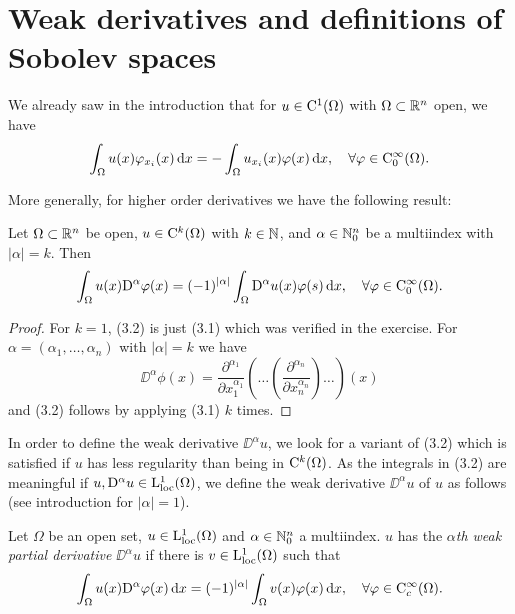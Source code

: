 \section{Weak derivatives and definitions of Sobolev spaces}

We already saw in the introduction that for $u \in \mathrm{C}^1(\Omega)$ with $\Omega \subset \mathbb{R}^n$ open, we have 
\begin{equation}
  \int_\Omega u(x) \varphi_{x_i}(x) \, {\operatorname{d}\!{x}} = -\int_\Omega u_{x_i}(x) \varphi(x) \, {\operatorname{d}\!{x}}, \quad \forall \varphi \in \mathrm{C}_0^\infty(\Omega).
\end{equation}

More generally, for higher order derivatives we have the following result:
\begin{lem}
  Let $\Omega \subset \mathbb{R}^n$ be open, $u \in \mathrm{C}^k(\Omega)$ with $k \in \mathbb{N}$, and $\alpha \in \mathbb{N}_0^n$ be a multiindex with $|\alpha| = k$. Then
  \begin{equation}
    \int_\Omega u(x) \mathrm{D}^\alpha \varphi(x) = (-1)^{|\alpha|} \int_\Omega \mathrm{D}^\alpha u(x) \varphi(s) \, {\operatorname{d}\!{x}}, \quad\forall \varphi \in \mathrm{C}_0^\infty(\Omega).
  \end{equation}
\end{lem}

\begin{proof}
  For $k = 1$, (3.2) is just (3.1) which was verified in the exercise.
  For $\alpha = (\alpha_1,\dots,\alpha_n)$ with $|\alpha| = k$ we have
  $$
  \DD^\alpha \phi(x)= \frac{\partial^{\alpha_1}}{\partial x_1^{\alpha_1}} ( \dots ( \frac{\partial^{\alpha_n}}{\partial x_n^{\alpha_n}} ) \dots )(x)
  $$
  and (3.2) follows by applying (3.1) $k$ times.
\end{proof}

In order to define the weak derivative $\DD^\alpha u$, we look for a variant of (3.2) which is satisfied if $u$ has less regularity than being in $\mathrm{C}^k(\Omega)$.
As the integrals in (3.2) are meaningful if $u, \mathrm{D}^\alpha u \in \mathrm{L}^1_{\operatorname{loc}}(\Omega)$, we define the weak derivative $\DD^\alpha u$ of $u$ as follows (see introduction for $|\alpha| = 1$).

\begin{defn}
  Let $\Omega$ be an open set, $u \in \mathrm{L}^1_{\operatorname{loc}}(\Omega)$ and $\alpha \in \mathbb{N}_0^n$ a multiindex. 
  $u$ has the \emph{$\alpha$th weak partial derivative} $\DD^\alpha u$ if there is $v \in \mathrm{L}_{\operatorname{loc}}^1(\Omega)$ such that
  \begin{equation}
    \int_\Omega u(x) \mathrm{D}^\alpha \varphi(x) \, {\operatorname{d}\!{x}} = (-1)^{|\alpha|} \int_\Omega v(x) \varphi(x) \, {\operatorname{d}\!{x}}, \quad \forall \varphi \in \mathrm{C}_c^\infty(\Omega).
  \end{equation}
\end{defn}

